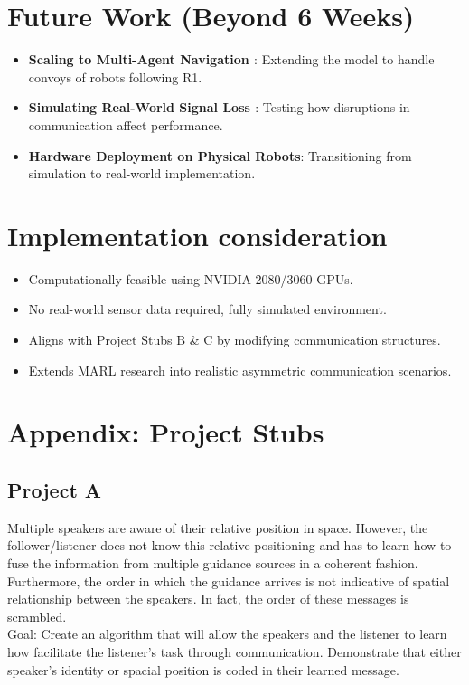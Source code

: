 \documentclass[a4paper,11pt]{article}
\begin{document}
\section*{Future Work (Beyond 6 Weeks)}
\begin{itemize}
    \item \textbf{Scaling to Multi-Agent Navigation \cite{off-beat-MARL}}:  Extending the model to handle convoys of robots following R1.
    \item \textbf{Simulating Real-World Signal Loss \cite{D-MARL}}: Testing how disruptions in communication affect performance.
    \item \textbf{Hardware Deployment on Physical Robots}: Transitioning from simulation to real-world implementation.
\end{itemize}

\section{Implementation consideration}
\begin{itemize}
    \item Computationally feasible using NVIDIA 2080/3060 GPUs.
    \item No real-world sensor data required, fully simulated environment.
    \item Aligns with Project Stubs B \& C by modifying communication structures.
    \item Extends MARL research into realistic asymmetric communication scenarios.
\end{itemize}

\printbibliography

\section*{Appendix: Project Stubs}
\subsection*{Project A}
Multiple speakers are aware of their relative position in space. However, the follower/listener does not know this relative positioning and has to learn how to fuse the information from multiple guidance sources in a coherent fashion. Furthermore, the order in which the guidance arrives is not indicative of spatial relationship between the speakers. In fact, the order of these messages is scrambled.
\\
Goal: Create an algorithm that will allow the speakers and the listener to learn how facilitate the listener's task through communication. Demonstrate that either speaker's identity or spacial position is coded in their learned message.
\end{document}
